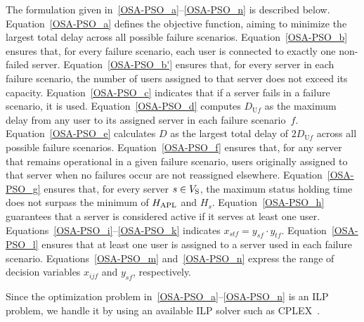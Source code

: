 \documentclass[conference]{IEEEtran}
\newcommand\magenta[1]{\textcolor{magenta}{#1}}
\begin{document}
\begin{CJK}{UTF8}{ipxm}
The formulation given in~\eqref{OSA-PSO_a}--\eqref{OSA-PSO_n} is described below.
Equation~\eqref{OSA-PSO_a} defines the objective function, aiming to minimize the largest total delay across all possible failure scenarios.
Equation~\eqref{OSA-PSO_b} ensures that, for every failure scenario, each user is connected to exactly one non-failed server.
Equation~\eqref{OSA-PSO_b'} ensures that, for every server in each failure scenario, the number of users assigned to that server does not exceed its capacity.
Equation~\eqref{OSA-PSO_c} indicates that if a server fails in a failure scenario, it is used.
%
Equation~\eqref{OSA-PSO_d} computes $D_{\mathrm{U}f}$ as the maximum delay from any user to its assigned server in each failure scenario~$f$. %
Equation~\eqref{OSA-PSO_e} calculates $D$ as the largest total delay of $2D_{\mathrm{U}f}$ across all possible failure scenarios.
Equation~\eqref{OSA-PSO_f} ensures that, for any server that remains operational in a given failure scenario, users originally assigned to that server when no failures occur are not reassigned elsewhere.
Equation~\eqref{OSA-PSO_g} ensures that, for every server $s \in V_{\rm{S}}$, the maximum status holding time does not surpass the minimum of $H_{\rm APL}$ and $H_s$.
Equation~\eqref{OSA-PSO_h} guarantees that a server is considered active if it serves at least one user.
Equations~\eqref{OSA-PSO_i}--\eqref{OSA-PSO_k} indicates $x_{stf} = y_{sf} \cdot y_{tf}$.
Equation~\eqref{OSA-PSO_l} ensures that at least one user is assigned to a server used in each failure scenario. Equations~\eqref{OSA-PSO_m} and~\eqref{OSA-PSO_n} express the range of decision variables $x_{ijf}$ and $y_{sf}$, respectively.

Since the optimization problem in~\eqref{OSA-PSO_a}--\eqref{OSA-PSO_n} is an ILP problem, we handle it by using an available ILP solver such as CPLEX~\cite{CPLEX}.


\end{CJK}
\end{document}
